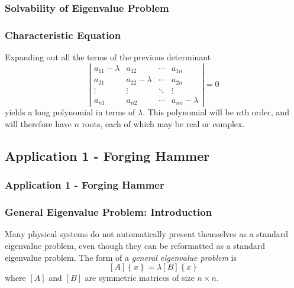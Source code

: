 \documentclass[fleqn]{ltx-talk} %
\newcommand{\sectionIIsubsectionIItitle}{Solvability of Eigenvalue Problem}
\newcommand{\sectionIIsubsectionIIItitle}{Application 1 - Forging Hammer}
\begin{document}
			\begin{frame}
				\frametitle{\sectionIIsubsectionIItitle} \small
				\bigskip

				 \frametitle{Characteristic Equation}
  
				  Expanding out all the terms of the previous determinant
				  \begin{displaymath}
				    \left| \begin{array}{cccc}
				        a_{11}-\lambda & a_{12} & \cdots & a_{1n} \\
				        a_{21} & a_{22}-\lambda & \cdots & a_{2n} \\
				        \vdots & \vdots & \ddots & \vdots \\
				        a_{n1} & a_{n2} & \cdots & a_{nn}-\lambda
				      \end{array} \right| = 0
				  \end{displaymath}
				  yields a long polynomial in terms of $\lambda$. This polynomial will
				  be $n$th order, and will therefore have $n$ roots, each of which may
				  be real or complex.

				\btVFill
			\end{frame}		


		\subsection{\sectionIIsubsectionIIItitle}\label{sectionIIsubsectionIII}

			\begin{frame}
				\frametitle{\sectionIIsubsectionIIItitle} \small
				\bigskip

				\frametitle{General Eigenvalue Problem: Introduction}
  
				Many physical systems do not automatically present themselves as a
				standard eigenvalue problem, even though they can be reformatted as
				a standard eigenvalue problem. The form of a \emph{general
				eigenvalue problem} is
				\begin{displaymath}
				\left[ A \right] \left\{ x \right\} = \lambda \left[ B \right] \left\{ x \right\}
				\end{displaymath}
				where $[A]$ and $[B]$ are symmetric matrices of size $n \times n$.
							
				\btVFill 
			\end{frame}
\end{document}
